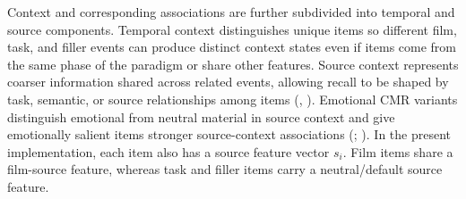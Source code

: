 \documentclass[
  man,
  floatsintext,
  longtable,
  nolmodern,
  notxfonts,
  notimes,
  draftfirst,
  colorlinks=true,linkcolor=blue,citecolor=blue,urlcolor=blue]{apa7}
\begin{document}
Context and corresponding associations are further subdivided into
temporal and source components. Temporal context distinguishes unique
items so different film, task, and filler events can produce distinct
context states even if items come from the same phase of the paradigm or
share other features. Source context represents coarser information
shared across related events, allowing recall to be shaped by task,
semantic, or source relationships among items
(,
). Emotional CMR variants distinguish
emotional from neutral material in source context and give emotionally
salient items stronger source-context associations
(;
). In the present
implementation, each item also has a source feature vector \(s_i\). Film
items share a film-source feature, whereas task and filler items carry a
neutral/default source feature.
\end{document}
